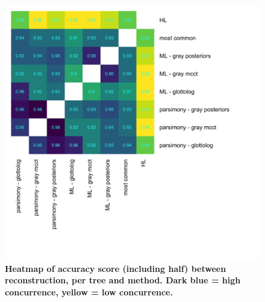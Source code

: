 \documentclass[12pt,letterpaper]{article}
\begin{document}
\begin{figure}[ht]
\centering
\includegraphics[width=16cm]{illustrations/plots_from_R/results/accuracy_score_heatmap_all_methods.png}
\caption{\textbf{Heatmap of accuracy score (including half) between reconstruction, per tree and method. Dark blue = high concurrence, yellow = low concurrence.}}
\label{heatmap_accuracy_score_methods}
\end{figure}



\end{document}
